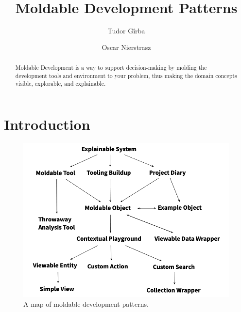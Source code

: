 \documentclass[sigconf]{acmart}
\begin{document}
\title{Moldable Development Patterns}

\author{Tudor G\^irba}

\author{Oscar Nierstrasz}

\renewcommand{\shortauthors}{G\^irba et al.}

\begin{abstract}
Moldable Development is a way to support decision-making by molding the development tools and environment to your problem, thus making the domain concepts visible, explorable, and explainable.
\end{abstract}



\maketitle

\section{Introduction}

\cite{Chis17a}


\begin{figure}
  \includegraphics[width=\columnwidth]{map}
  \caption{A map of moldable development patterns.}
  \label{fig:map}
\end{figure}
\end{document}
